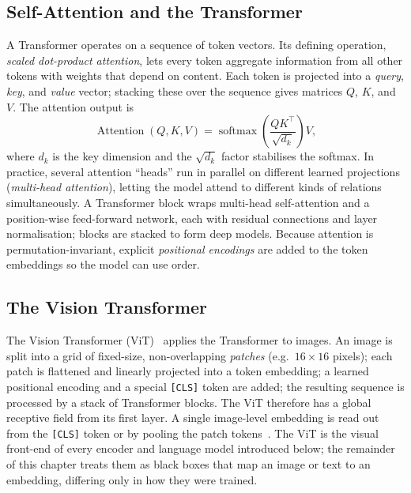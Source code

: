 \subsection{Self-Attention and the Transformer}

A Transformer operates on a sequence of token vectors. Its defining operation,
\emph{scaled dot-product attention}, lets every token aggregate information from
all other tokens with weights that depend on content. Each token is projected
into a \emph{query}, \emph{key}, and \emph{value} vector; stacking these over
the sequence gives matrices $Q$, $K$, and $V$. The attention output is
\begin{equation}\label{eq:attention}
  \operatorname{Attention}(Q,K,V)
  = \operatorname{softmax}\!\left(\frac{QK^{\top}}{\sqrt{d_{k}}}\right)V,
\end{equation}
where $d_{k}$ is the key dimension and the $\sqrt{d_{k}}$ factor stabilises the
softmax. In practice, several attention ``heads'' run in parallel on different
learned projections (\emph{multi-head attention}), letting the model attend to
different kinds of relations simultaneously. A Transformer block wraps
multi-head self-attention and a position-wise feed-forward network, each with
residual connections and layer normalisation; blocks are stacked to form deep
models. Because attention is permutation-invariant, explicit \emph{positional
encodings} are added to the token embeddings so the model can use order.

\subsection{The Vision Transformer}

The Vision Transformer (ViT)~\cite{dosovitskiy2021vit} applies the Transformer
to images. An image is split into a grid of fixed-size, non-overlapping
\emph{patches} (e.g.\ $16{\times}16$ pixels); each patch is flattened and
linearly projected into a token embedding; a learned positional encoding and a
special \texttt{[CLS]} token are added; the resulting sequence is processed by a
stack of Transformer blocks. The ViT therefore has a global receptive field from
its first layer. A single image-level embedding is read out from the
\texttt{[CLS]} token or by pooling the patch tokens~\cite{dosovitskiy2021vit}.
The ViT is the visual front-end of every encoder and language model introduced
below; the remainder of this chapter treats them as black boxes that map an image
or text to an embedding, differing only in how they were trained.

